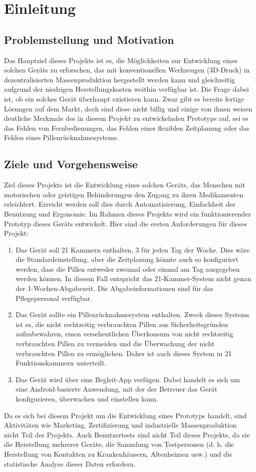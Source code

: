 \section{Einleitung}
\subsection{Problemstellung und Motivation}
Das Hauptziel dieses Projekts ist es, die Möglichkeiten zur Entwicklung eines solchen Geräts zu erforschen, das mit konventionellen Werkzeugen (3D-Druck) in dezentralisierten Massenproduktion hergestellt werden kann und gleichzeitig aufgrund der niedrigen Herstellungskosten weithin verfügbar ist. Die Frage dabei ist, ob ein solches Gerät überhaupt existieren kann. Zwar gibt es bereits fertige Lösungen auf dem Markt, doch sind diese nicht billig und einige von ihnen weisen deutliche Merkmale des in diesem Projekt zu entwickelnden Prototyps auf, sei es das Fehlen von Fernbedienungen, das Fehlen einer flexiblen Zeitplanung oder das Fehlen eines Pillenrücknahmesystems.
\subsection{Ziele und Vorgehensweise}
   Ziel dieses Projekts ist die Entwicklung eines solchen Geräts, das Menschen mit motorischen oder geistigen Behinderungen den Zugang zu ihren Medikamenten erleichtert. Erreicht werden soll dies durch Automatisierung, Einfachheit der Benutzung und Ergonomie. Im Rahmen dieses Projekts wird ein funktionierender Prototyp dieses Geräts entwickelt. Hier sind die ersten Anforderungen für dieses Projekt:
   \begin{enumerate}
   	
   	\item Das Gerät soll 21 Kammern enthalten, 3 für jeden Tag der Woche. Dies wäre die Standardeinstellung, aber die Zeitplanung könnte auch so konfiguriert werden, dass die Pillen entweder zweimal oder einmal am Tag ausgegeben werden können. In diesem Fall entspricht das 21-Kammer-System nicht genau der 1-Wochen-Abgabezeit. Die Abgabeinformationen sind für das Pflegepersonal verfügbar.
   	\item Das Gerät sollte ein Pillenrücknahmesystem enthalten. Zweck dieses Systems ist es, die nicht rechtzeitig verbrauchten Pillen aus Sicherheitsgründen aufzubewahren, einen versehentlichen Überkonsum von nicht rechtzeitig verbrauchten Pillen zu vermeiden und die Überwachung der nicht verbrauchten Pillen zu ermöglichen. Daher ist auch dieses System in 21 Funktionskammern unterteilt.
   	\item Das Gerät wird über eine Begleit-App verfügen. Dabei handelt es sich um eine Android-basierte Anwendung, mit der der Betreuer das Gerät konfigurieren, überwachen und einstellen kann.
\end{enumerate}
 Da es sich bei diesem Projekt um die Entwicklung eines Prototyps handelt, sind Aktivitäten wie Marketing, Zertifizierung und industrielle Massenproduktion nicht Teil des Projekts.
Auch Benutzertests sind nicht Teil dieses Projekts, da sie die Herstellung mehrerer Geräte, die Sammlung von Testpersonen (d. h. die Herstellung von Kontakten zu Krankenhäusern, Altenheimen usw.) und die statistische Analyse dieser Daten erfordern.

